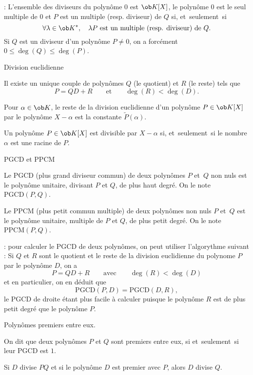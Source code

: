 \Remarque : L'ensemble des diviseurs du polyn\^ome $0$ est $\ob K[X]$, le polyn\^ome $0$ est le seul multiple de $0$ et 
$P$ est un multiple (resp. diviseur) de $Q$ si, et~seulement~si
$$
\forall\lambda\in\ob K^*, \quad \lambda P \mbox{ est un multiple (resp. diviseur) de }Q.
$$ 
Si $Q$ est un diviseur d'un polyn\^ome $P\neq0$, on a forc\'ement $0\le\deg(Q)\le\deg(P)$. 
\bigskip

\Concept [] Division euclidienne

\Theoreme [Title=Division euclidienne;$P$ et $D\neq0$ polyn\^omes \`a coefficients dans $\ob K$]
Il existe un unique couple de polyn\^omes $Q$ (le quotient) et $R$ (le reste) tels que 
$$
P=QD+R\qquad \mbox{et}\qquad\deg(R)<\deg(D).
$$

\Propriete []  Pour $\alpha\in\ob K$, le reste de la division euclidienne d'un polyn\^ome $P\in\ob K[X]$ par le polyn\^ome $X-\alpha$ est la constante $\tilde P(\alpha)$. 
\bigskip

\Propriete []  Un polyn\^ome $P\in\ob K[X]$ est divisible par $X-\alpha$ si, et~seulement~si le nombre $\alpha$ est une racine de $P$. 
\bigskip

\Concept [] PGCD et PPCM

\Definition []  Le PGCD (plus grand diviseur commun) de deux polyn\^omes $P$ et~$Q$ non nuls est le polyn\^ome unitaire, 
divisant $P$ et $Q$, de plus haut degr\'e. On le note $\mbox{PGCD}(P,Q)$. 
\bigskip

\Definition []  Le PPCM (plus petit commun multiple) de deux polyn\^omes non nuls $P$ et~$Q$ est le polyn\^ome unitaire, multiple 
de $P$ et $Q$, de plus petit degr\'e. On le note $\mbox{PPCM}(P,Q)$. 
\bigskip

 : pour calculer le PGCD de deux polyn\^omes, on peut utiliser l'algorythme suivant : 
Si $Q$ et $R$ sont le quotient et le reste de la division euclidienne du polynome $P$ par le polyn\^ome $D$, on a 
$$
P=QD+R\qquad\mbox{avec}\qquad\deg(R)< \deg(D)
$$
et en particulier, on en d\'eduit que 
$$
\mbox{PGCD}(P,D)=\mbox{PGCD}(D,R),
$$
le PGCD de droite \'etant plus facile \`a calculer puisque le polyn\^ome $R$ est de plus petit degr\'e que le polyn\^ome $P$. 
\bigskip

\Concept [] Polyn\^omes premiers entre eux. 

\Definition []  On dit que deux polyn\^omes $P$ et $Q$ sont premiers entre eux, si et~seulement~si leur PGCD est $1$. 
\bigskip

\Theoreme [Title=Th\'eor\`eme de Gauss;$P$ et $Q$ deux polyn\^omes non nul] 
Si $D$ divise $PQ$ et si le polyn\^ome $D$ est premier avec $P$, alors $D$ divise $Q$. 
\bigskip
  
